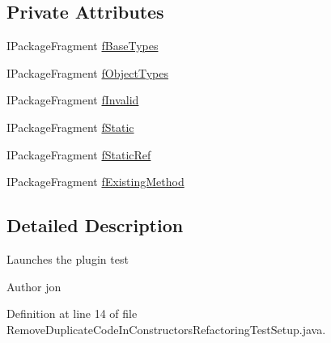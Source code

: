 \subsection*{Private Attributes}
\begin{DoxyCompactItemize}
\item 
IPackageFragment \hyperlink{classedu_1_1illinois_1_1canistelCassabanana_1_1tests_1_1RemoveDuplicateCodeInConstructorsRefactoringTestSetup_a6c6ee1308a16ef2cbdd1a66605a4fbfa}{fBaseTypes}
\item 
IPackageFragment \hyperlink{classedu_1_1illinois_1_1canistelCassabanana_1_1tests_1_1RemoveDuplicateCodeInConstructorsRefactoringTestSetup_abe1fbe53e3d90f623a37cc5c933145dc}{fObjectTypes}
\item 
IPackageFragment \hyperlink{classedu_1_1illinois_1_1canistelCassabanana_1_1tests_1_1RemoveDuplicateCodeInConstructorsRefactoringTestSetup_a421cc733d2ba660b2cbc1ffb94b6ba5c}{fInvalid}
\item 
IPackageFragment \hyperlink{classedu_1_1illinois_1_1canistelCassabanana_1_1tests_1_1RemoveDuplicateCodeInConstructorsRefactoringTestSetup_a46435fa8daac96d40f1be8e638df6d4e}{fStatic}
\item 
IPackageFragment \hyperlink{classedu_1_1illinois_1_1canistelCassabanana_1_1tests_1_1RemoveDuplicateCodeInConstructorsRefactoringTestSetup_ac1eec28ae69c00995fd82d6182c27ab9}{fStaticRef}
\item 
IPackageFragment \hyperlink{classedu_1_1illinois_1_1canistelCassabanana_1_1tests_1_1RemoveDuplicateCodeInConstructorsRefactoringTestSetup_a220aede9c7539af9e2ebef07cbf6ab53}{fExistingMethod}
\end{DoxyCompactItemize}


\subsection{Detailed Description}
Launches the plugin test

\begin{DoxyAuthor}{Author}
jon 
\end{DoxyAuthor}


Definition at line 14 of file RemoveDuplicateCodeInConstructorsRefactoringTestSetup.java.



